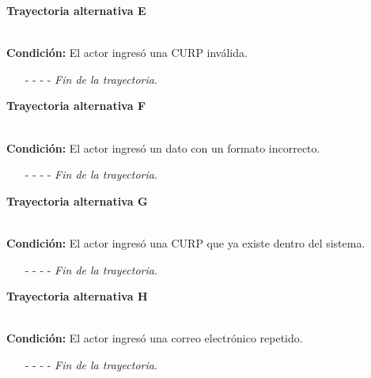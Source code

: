 \hypertarget{CU3-1:TAE}{\textbf{Trayectoria alternativa E}}\\
\noindent \textbf{Condición:} El actor ingresó una CURP inválida.
\begin{enumerate}
	\UCpaso[\UCsist] Muestra el mensaje  señalando el campo que presenta el error en la pantalla .
	\UCpaso Regresa al paso \ref{CU3.1-P3} de la trayectoria principal.
	\item[- -] - - {\em {Fin de la trayectoria}}.
\end{enumerate}
\hypertarget{CU3-1:TAF}{\textbf{Trayectoria alternativa F}}\\
\noindent \textbf{Condición:} El actor ingresó un dato con un formato incorrecto.
\begin{enumerate}
	\UCpaso[\UCsist] Muestra el mensaje  señalando el campo que presenta el error en la pantalla .
	\UCpaso Regresa al paso \ref{CU3.1-P3} de la trayectoria principal.
	\item[- -] - - {\em {Fin de la trayectoria}}.
\end{enumerate}
\hypertarget{CU3-1:TAG}{\textbf{Trayectoria alternativa G}}\\
\noindent \textbf{Condición:} El actor ingresó una CURP que ya existe dentro del sistema.
\begin{enumerate}
	\UCpaso[\UCsist] Muestra el mensaje  señalando el campo que presenta la duplicidad en la pantalla .
	\UCpaso Regresa al paso \ref{CU3.1-P3} de la trayectoria principal.
	\item[- -] - - {\em {Fin de la trayectoria}}.
\end{enumerate}
\hypertarget{CU3-1:TAH}{\textbf{Trayectoria alternativa H}}\\
\noindent \textbf{Condición:} El actor ingresó una correo electrónico repetido.
\begin{enumerate}
	\UCpaso[\UCsist] Muestra el mensaje  señalando el campo que presenta la duplicidad en la pantalla .
	\UCpaso Regresa al paso \ref{CU3.1-P3} de la trayectoria principal.
	\item[- -] - - {\em {Fin de la trayectoria}}.
\end{enumerate}

